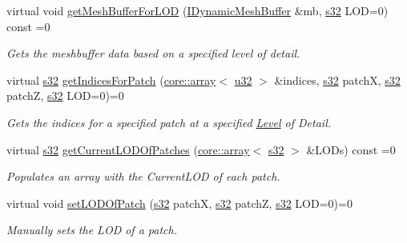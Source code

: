 \begin{DoxyCompactItemize}
virtual void \hyperlink{classirr_1_1scene_1_1ITerrainSceneNode_ae23af8c2066da39ad10714dcf95dd8f1}{get\+Mesh\+Buffer\+For\+L\+OD} (\hyperlink{classirr_1_1scene_1_1IDynamicMeshBuffer}{I\+Dynamic\+Mesh\+Buffer} \&mb, \hyperlink{namespaceirr_ac66849b7a6ed16e30ebede579f9b47c6}{s32} L\+OD=0) const =0
\begin{DoxyCompactList}\small\item\em Gets the meshbuffer data based on a specified level of detail. \end{DoxyCompactList}\item 
virtual \hyperlink{namespaceirr_ac66849b7a6ed16e30ebede579f9b47c6}{s32} \hyperlink{classirr_1_1scene_1_1ITerrainSceneNode_aec6d83c4882fad10a0b35ca5a7ec0935}{get\+Indices\+For\+Patch} (\hyperlink{classirr_1_1core_1_1array}{core\+::array}$<$ \hyperlink{namespaceirr_a0416a53257075833e7002efd0a18e804}{u32} $>$ \&indices, \hyperlink{namespaceirr_ac66849b7a6ed16e30ebede579f9b47c6}{s32} patchX, \hyperlink{namespaceirr_ac66849b7a6ed16e30ebede579f9b47c6}{s32} patchZ, \hyperlink{namespaceirr_ac66849b7a6ed16e30ebede579f9b47c6}{s32} L\+OD=0)=0
\begin{DoxyCompactList}\small\item\em Gets the indices for a specified patch at a specified \hyperlink{classLevel}{Level} of Detail. \end{DoxyCompactList}\item 
virtual \hyperlink{namespaceirr_ac66849b7a6ed16e30ebede579f9b47c6}{s32} \hyperlink{classirr_1_1scene_1_1ITerrainSceneNode_a0d310851f0ebf1fce18d3a2c0f3dceab}{get\+Current\+L\+O\+D\+Of\+Patches} (\hyperlink{classirr_1_1core_1_1array}{core\+::array}$<$ \hyperlink{namespaceirr_ac66849b7a6ed16e30ebede579f9b47c6}{s32} $>$ \&L\+O\+Ds) const =0
\begin{DoxyCompactList}\small\item\em Populates an array with the Current\+L\+OD of each patch. \end{DoxyCompactList}\item 
virtual void \hyperlink{classirr_1_1scene_1_1ITerrainSceneNode_a41b7f1ee70511d648cc11217347160ad}{set\+L\+O\+D\+Of\+Patch} (\hyperlink{namespaceirr_ac66849b7a6ed16e30ebede579f9b47c6}{s32} patchX, \hyperlink{namespaceirr_ac66849b7a6ed16e30ebede579f9b47c6}{s32} patchZ, \hyperlink{namespaceirr_ac66849b7a6ed16e30ebede579f9b47c6}{s32} L\+OD=0)=0
\begin{DoxyCompactList}\small\item\em Manually sets the L\+OD of a patch. \end{DoxyCompactList}\item 

\end{DoxyCompactItemize}
